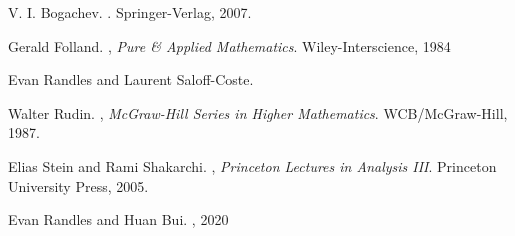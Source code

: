 \documentclass{article}
\theoremstyle{definition}
\theoremstyle{theorem}
\begin{document}
\newpage


\begin{thebibliography}{99}

V. I. Bogachev.
.
\newblock Springer-Verlag, 2007.

Gerald Folland.
, {\em Pure \& Applied Mathematics}.
\newblock Wiley-Interscience, 1984

Evan Randles and Laurent Saloff-Coste. 


Walter Rudin.
, {\em McGraw-Hill Series in Higher Mathematics}.
\newblock WCB/McGraw-Hill, 1987.

Elias Stein and Rami Shakarchi.
, {\em Princeton Lectures in Analysis III}.
\newblock Princeton University Press, 2005.


Evan Randles and Huan Bui.
, 2020



\end{thebibliography}
\end{document}

